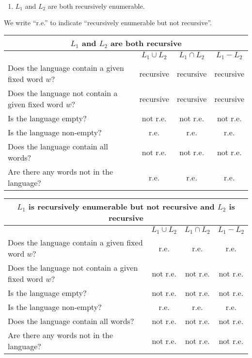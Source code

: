 \begin{enumerate}[1.]
    \item \(L_1\) and \(L_2\) are both recursively enumerable.
    
\end{enumerate}
We write ``r.e.'' to indicate ``recursively enumerable but not recursive''. 

\begin{tabular}{|l|c|c|c|}\hline
    \multicolumn{4}{|c|}{\(L_1\) and \(L_2\) are both recursive}\\\hline
    & \(L_1 \cup L_2\) & \(L_1 \cap L_2\) & \(L_1 - L_2\)\\\hline
    Does the language contain a given fixed word \(w\)? & recursive & recursive & recursive\\\hline
    Does the language not contain a given fixed word \(w\)? & recursive & recursive & recursive\\\hline
    Is the language empty? & not r.e. & not r.e. & not r.e.\\\hline
    Is the language non-empty? & r.e. & r.e. & r.e.\\\hline
    Does the language contain all words? & not r.e. & not r.e. & not r.e.\\\hline
    Are there any words not in the language? & r.e. & r.e. & r.e.\\\hline 
\end{tabular}

\begin{tabular}{|l|c|c|c|}\hline
    \multicolumn{4}{|c|}{\(L_1\) is recursively enumerable but not recursive and \(L_2\) is recursive}\\\hline
    & \(L_1 \cup L_2\) & \(L_1 \cap L_2\) & \(L_1 - L_2\)\\\hline
    Does the language contain a given fixed word \(w\)? & r.e. & r.e. & r.e.\\\hline
    Does the language not contain a given fixed word \(w\)? & not r.e. & not r.e. & not r.e.\\\hline
    Is the language empty? & not r.e. & not r.e. & not r.e.\\\hline
    Is the language non-empty? & r.e. & r.e. & r.e.\\\hline
    Does the language contain all words? & not r.e. & not r.e. & not r.e.\\\hline
    Are there any words not in the language? & not r.e. & not r.e. & not r.e.\\\hline 
\end{tabular}